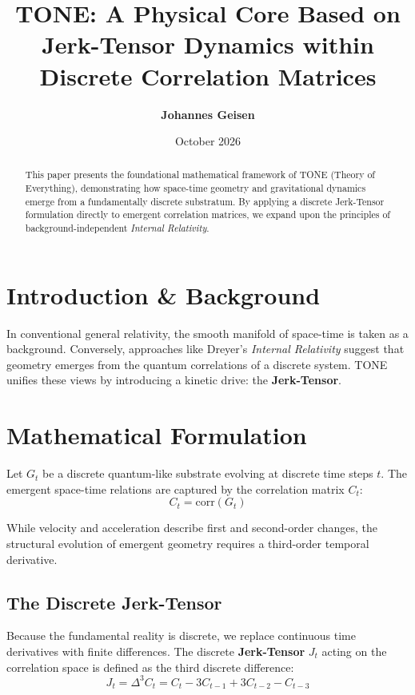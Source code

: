 \documentclass[11pt,a4paper]{article}
\title{\textbf{TONE: A Physical Core Based on Jerk-Tensor Dynamics within Discrete Correlation Matrices}}
\author{\textbf{Johannes Geisen}}
\date{October 2026}
\begin{document}
\maketitle

\begin{abstract}
This paper presents the foundational mathematical framework of TONE (Theory of Everything), demonstrating how space-time geometry and gravitational dynamics emerge from a fundamentally discrete substratum. By applying a discrete Jerk-Tensor formulation directly to emergent correlation matrices, we expand upon the principles of background-independent \textit{Internal Relativity}.
\end{abstract}
\clearpage
\section{Introduction \& Background}
In conventional general relativity, the smooth manifold of space-time is taken as a background. Conversely, approaches like Dreyer's \textit{Internal Relativity} suggest that geometry emerges from the quantum correlations of a discrete system. TONE unifies these views by introducing a kinetic drive: the \textbf{Jerk-Tensor}.

\section{Mathematical Formulation}
Let $G_t$ be a discrete quantum-like substrate evolving at discrete time steps $t$. The emergent space-time relations are captured by the correlation matrix $C_t$:
\begin{equation}
C_t = \text{corr}(G_t)
\end{equation}

While velocity and acceleration describe first and second-order changes, the structural evolution of emergent geometry requires a third-order temporal derivative. 

\subsection{The Discrete Jerk-Tensor}
Because the fundamental reality is discrete, we replace continuous time derivatives with finite differences. The discrete \textbf{Jerk-Tensor} $J_t$ acting on the correlation space is defined as the third discrete difference:
\begin{equation}
J_t = \Delta^3 C_t = C_t - 3C_{t-1} + 3C_{t-2} - C_{t-3}
\end{equation}
\end{document}
